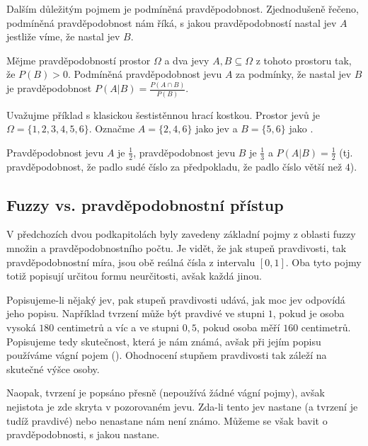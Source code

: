 \documentclass[a4paper,10pt]{article}
\begin{document}
Dalším důležitým pojmem je podmíněná pravděpodobnost. Zjednodušeně řečeno, podmíněná pravděpodobnost nám říká, s jakou pravděpodobností nastal jev $A$ jestliže víme, že nastal jev $B$.

\begin{definition}
 Mějme pravděpodobností prostor $\Omega$ a dva jevy $A, B \subseteq \Omega$ z tohoto prostoru tak, že $P(B) > 0$. Podmíněná pravděpodobnost jevu $A$ za podmínky, že nastal jev $B$ je pravděpodobnost $P(A | B) = \frac{P(A \cap B)}{P(B)}$.
\end{definition}

\begin{example}
 Uvažujme příklad s klasickou šestistěnnou hrací kostkou. Prostor jevů je $\Omega = \{ 1,2,3,4,5,6 \}$. Označme $A = \{2, 4, 6\}$ jako jev  a $B = \{ 5, 6 \}$ jako .
 
 Pravděpodobnost jevu $A$ je $\frac{1}{2}$, pravděpodobnost jevu $B$ je $\frac{1}{3}$ a $P(A | B) = \frac{1}{2}$ (tj. pravděpodobnost, že padlo sudé číslo za předpokladu, že padlo číslo větší než $4$).
\end{example}


\subsection{Fuzzy vs. pravděpodobnostní přístup} \label{subsec:FuzzyVsProb}
V předchozích dvou podkapitolách byly zavedeny základní pojmy z oblasti fuzzy množin a pravděpodobnostního počtu. Je vidět, že jak stupeň pravdivosti, tak pravděpodobnostní míra, jsou obě reálná čísla z intervalu $[0, 1]$. Oba tyto pojmy totiž popisují určitou formu neurčitosti, avšak každá jinou. 

Popisujeme-li nějaký jev, pak stupeň pravdivosti udává, jak moc jev odpovídá jeho popisu. Například tvrzení  může být pravdivé ve stupni $1$, pokud je osoba vysoká $180$ centimetrů a víc a ve stupni $0,5$, pokud osoba měří $160$ centimetrů. Popisujeme tedy skutečnost, která je nám známá, avšak při jejím popisu používáme vágní pojem (). Ohodnocení stupňem pravdivosti tak záleží na skutečné výšce osoby.

Naopak, tvrzení  je popsáno přesně (nepoužívá žádné vágní pojmy), avšak nejistota je zde skryta v pozorovaném jevu. Zda-li tento jev nastane (a tvrzení je tudíž pravdivé) nebo nenastane nám není známo. Můžeme se však bavit o pravděpodobnosti, s jakou nastane.
\end{document}
